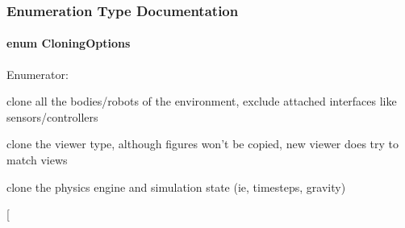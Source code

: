 \subsubsection{Enumeration Type Documentation}
\hypertarget{namespaceOpenRAVE_a16bea31a72c441a002538eac01a118f2}{
\paragraph[{CloningOptions}]{\setlength{\rightskip}{0pt plus 5cm}enum {\bf CloningOptions}}\hfill}
\label{namespaceOpenRAVE_a16bea31a72c441a002538eac01a118f2}
\begin{Desc}
\item[Enumerator: ]\par
\begin{description}
\item[{\em 
\hypertarget{namespaceOpenRAVE_a16bea31a72c441a002538eac01a118f2a0c49bf8f6cc2b8f1731b1aa8326c5e63}{
Clone\_\-Bodies}
\label{namespaceOpenRAVE_a16bea31a72c441a002538eac01a118f2a0c49bf8f6cc2b8f1731b1aa8326c5e63}
}]clone all the bodies/robots of the environment, exclude attached interfaces like sensors/controllers \item[{\em 
\hypertarget{namespaceOpenRAVE_a16bea31a72c441a002538eac01a118f2a63f15f42828f381ffc43e2c3a894e792}{
Clone\_\-Viewer}
\label{namespaceOpenRAVE_a16bea31a72c441a002538eac01a118f2a63f15f42828f381ffc43e2c3a894e792}
}]clone the viewer type, although figures won't be copied, new viewer does try to match views \item[{\em 
\hypertarget{namespaceOpenRAVE_a16bea31a72c441a002538eac01a118f2a4f7d3c1c073424a486131d5516cbee6a}{
Clone\_\-Simulation}
\label{namespaceOpenRAVE_a16bea31a72c441a002538eac01a118f2a4f7d3c1c073424a486131d5516cbee6a}
}]clone the physics engine and simulation state (ie, timesteps, gravity) \item[{\em 
\hypertarget{namespaceOpenRAVE_a16bea31a72c441a002538eac01a118f2a0f3adf019cab24fd7564e167aac6308b}{
}}
\end{description}
\end{Desc}
